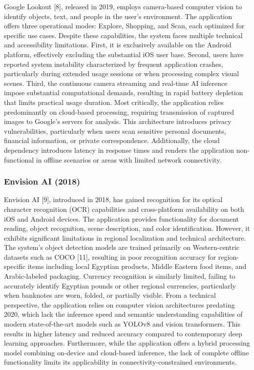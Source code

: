 \documentclass[a4paper]{report}
\begin{document}
Google Lookout [8], released in 2019, employs camera-based computer vision to identify objects, text, and people in the user's environment. The application offers three operational modes: Explore, Shopping, and Scan, each optimized for specific use cases. Despite these capabilities, the system faces multiple technical and accessibility limitations. First, it is exclusively available on the Android platform, effectively excluding the substantial iOS user base. Second, users have reported system instability characterized by frequent application crashes, particularly during extended usage sessions or when processing complex visual scenes. Third, the continuous camera streaming and real-time AI inference impose substantial computational demands, resulting in rapid battery depletion that limits practical usage duration. Most critically, the application relies predominantly on cloud-based processing, requiring transmission of captured images to Google's servers for analysis. This architecture introduces privacy vulnerabilities, particularly when users scan sensitive personal documents, financial information, or private correspondence. Additionally, the cloud dependency introduces latency in response times and renders the application non-functional in offline scenarios or areas with limited network connectivity.

\subsubsection{Envision AI (2018)}

Envision AI [9], introduced in 2018, has gained recognition for its optical character recognition (OCR) capabilities and cross-platform availability on both iOS and Android devices. The application provides functionality for document reading, object recognition, scene description, and color identification. However, it exhibits significant limitations in regional localization and technical architecture. The system's object detection models are trained primarily on Western-centric datasets such as COCO [11], resulting in poor recognition accuracy for region-specific items including local Egyptian products, Middle Eastern food items, and Arabic-labeled packaging. Currency recognition is similarly limited, failing to accurately identify Egyptian pounds or other regional currencies, particularly when banknotes are worn, folded, or partially visible. From a technical perspective, the application relies on computer vision architectures predating 2020, which lack the inference speed and semantic understanding capabilities of modern state-of-the-art models such as YOLOv8 and vision transformers. This results in higher latency and reduced accuracy compared to contemporary deep learning approaches. Furthermore, while the application offers a hybrid processing model combining on-device and cloud-based inference, the lack of complete offline functionality limits its applicability in connectivity-constrained environments.
\end{document}
